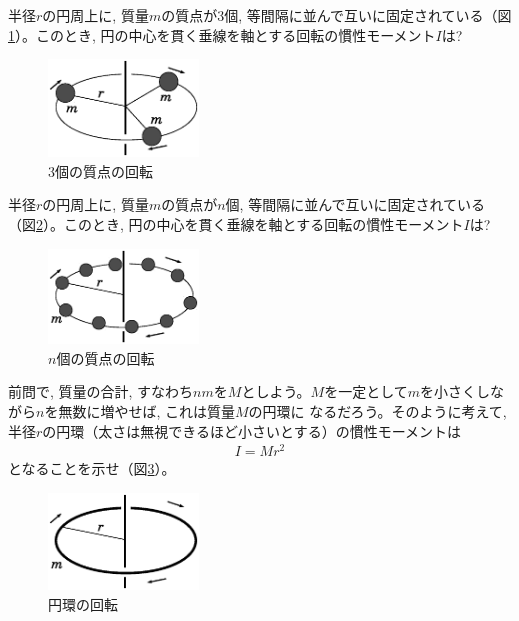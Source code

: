 %
\begin{q}\label{q:mominert_3points}
半径$r$の円周上に, 質量$m$の質点が3個, 等間隔に並んで互いに固定されている（図\ref{fig:disk1}）。このとき, 
円の中心を貫く垂線を軸とする回転の慣性モーメント$I$は?
\begin{figure}[h]
    \centering
    \includegraphics[width=4cm]{disk1.eps}
    \caption{3個の質点の回転}\label{fig:disk1}
\end{figure}
\end{q}

%
\begin{q}\label{q:mominert_npoints}
半径$r$の円周上に, 質量$m$の質点が$n$個, 等間隔に並んで互いに固定されている（図\ref{fig:disk2}）。このとき, 
円の中心を貫く垂線を軸とする回転の慣性モーメント$I$は?
\begin{figure}[h]
    \centering
    \includegraphics[width=4cm]{disk2.eps}
    \caption{$n$個の質点の回転}\label{fig:disk2}
\end{figure}
\end{q}
\vspace{0.2cm}

%
\begin{q}\label{q:mominert_ring}
前問で, 質量の合計, すなわち$nm$を$M$としよう。$M$を一定として$m$を小さくしながら$n$を無数に増やせば, これは質量$M$の円環に
なるだろう。そのように考えて, 半径$r$の円環（太さは無視できるほど小さいとする）の慣性モーメントは
\begin{eqnarray}
I=Mr^2\label{eq:mominert_ring}
\end{eqnarray}
となることを示せ（図\ref{fig:disk3}）。
\begin{figure}[h]
    \centering
    \includegraphics[width=4cm]{disk3.eps}
    \caption{円環の回転}\label{fig:disk3}
\end{figure}
\end{q}

